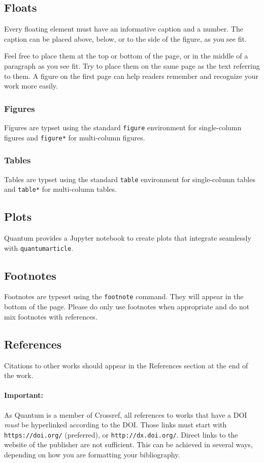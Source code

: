 \documentclass[a4paper,noarxiv,onecolumn]{quantumarticle}
\begin{document}
	\subsection{Floats}	
	Every floating element must have an informative caption and a number. The caption can be placed above, below, or to the side of the figure, as you see fit.
	
	Feel free to place them at the top or bottom of the page, or in the middle of a paragraph as you see fit. Try to place them on the same page as the text referring to them. A figure on the first page can help readers remember and recognize your work more easily.
	
	\subsubsection{Figures}
	Figures are typset using the standard \texttt{figure} environment for single-column figures and \texttt{figure*} for multi-column figures. 
	
	\subsubsection{Tables}
	Tables are typset using the standard \texttt{table} environment for single-column tables and \texttt{table*} for multi-column tables. 
	
	\subsection{Plots}
	Quantum provides a Jupyter notebook to create plots that integrate seamlessly with \texttt{quantumarticle}.
	
	\subsection{Footnotes}
	Footnotes are typeset using the \texttt{footnote} command. They will appear in the bottom of the page. Please do only use footnotes when appropriate and do not mix footnotes with references.
	
	\subsection{References}	
	Citations to other works should appear in the References section at the end of the work.
	
	\paragraph{Important:} As Quantum is a member of Crossref, all references to works that have a DOI \emph{must} be hyperlinked according to the DOI. Those links must start with \texttt{https://doi.org/} (preferred), or \texttt{http://dx.doi.org/}. Direct links to the website of the publisher are not sufficient. This can be achieved in several ways, depending on how you are formatting your bibliography.
	
\end{document}

